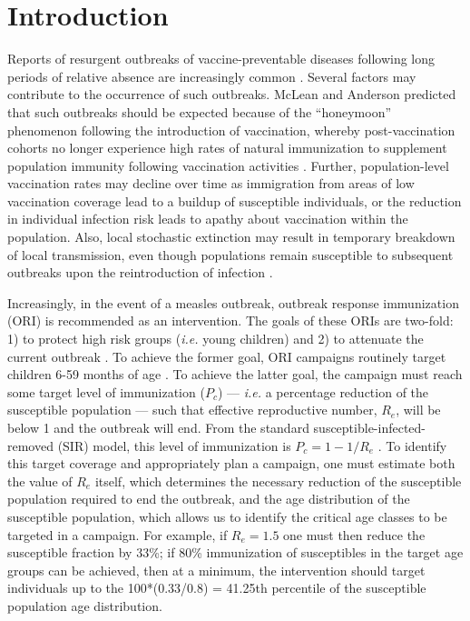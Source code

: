 \section{Introduction}\label{introduction}

Reports of resurgent outbreaks of vaccine-preventable diseases following long periods of relative absence are  increasingly common \cite{Hersh_1991, Cherry_2012, Celentano_2005, Shibeshi_2014}. Several factors may contribute to the occurrence of such outbreaks. McLean and Anderson \cite{McLean_1988} predicted that such outbreaks should be expected because of the ``honeymoon'' phenomenon following the introduction of vaccination, whereby post-vaccination cohorts no longer experience high rates of natural immunization to supplement population immunity following vaccination activities \cite{Jansen_2003}. Further, population-level vaccination rates may decline over time as immigration from areas of low vaccination coverage lead to a buildup of susceptible individuals, or the reduction in individual infection risk \cite{Omer_2009} leads to apathy about vaccination within the population. Also, local stochastic extinction may result in temporary breakdown of local transmission, even though populations remain susceptible to subsequent outbreaks upon the reintroduction of infection \cite{Ferrari_2008}.

Increasingly, in the event of a measles outbreak, outbreak response immunization (ORI) is recommended as an intervention. The goals of these ORIs are two-fold: 1) to protect high risk groups (\emph{i.e.} young children) and 2) to attenuate the current outbreak \cite{Cairns_2011,Grais_2011}. To achieve the former goal, ORI campaigns routinely target children 6-59 months of age \cite{Cairns_2011}. To achieve the latter goal, the campaign must reach some target level of immunization (\(P_c\)) --- \emph{i.e.} a percentage reduction of the susceptible population --- such that effective reproductive number, \(R_e\), will be below 1 and the outbreak will end. From the standard susceptible-infected-removed (SIR) model, this level of immunization is \(P_c = 1-1/R_e\) \cite{Anderson_1981}. To identify this target coverage and appropriately plan a campaign, one must estimate both the value of \(R_e\) itself, which determines the necessary reduction of the susceptible population required to end the outbreak, and the age distribution of the susceptible population, which allows us to identify the critical age classes to be targeted in a campaign. For example, if \(R_e=1.5\) one must then reduce the susceptible fraction by 33\%; if 80\% immunization of susceptibles in the target age groups can be achieved, then at a minimum, the intervention should target individuals up to the 100*(0.33/0.8) = 41.25th percentile of the susceptible population age distribution.

